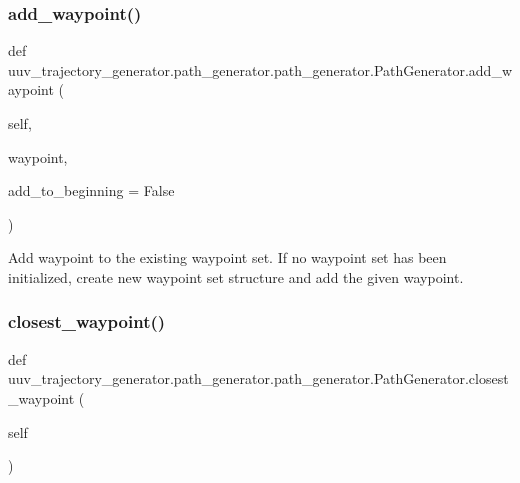 \subsubsection{\texorpdfstring{add\+\_\+waypoint()}{add\_waypoint()}}
{\footnotesize\ttfamily def uuv\+\_\+trajectory\+\_\+generator.\+path\+\_\+generator.\+path\+\_\+generator.\+Path\+Generator.\+add\+\_\+waypoint (\begin{DoxyParamCaption}\item[{}]{self,  }\item[{}]{waypoint,  }\item[{}]{add\+\_\+to\+\_\+beginning = {\ttfamily False} }\end{DoxyParamCaption})}

\begin{DoxyVerb}Add waypoint to the existing waypoint set. If no waypoint set has
been initialized, create new waypoint set structure and add the given
waypoint.\end{DoxyVerb}
 \mbox{\label{classuuv__trajectory__generator_1_1path__generator_1_1path__generator_1_1PathGenerator_a8449403b82c02c24779c0d40e069ded2}} 
\subsubsection{\texorpdfstring{closest\+\_\+waypoint()}{closest\_waypoint()}}
{\footnotesize\ttfamily def uuv\+\_\+trajectory\+\_\+generator.\+path\+\_\+generator.\+path\+\_\+generator.\+Path\+Generator.\+closest\+\_\+waypoint (\begin{DoxyParamCaption}\item[{}]{self }\end{DoxyParamCaption})}

